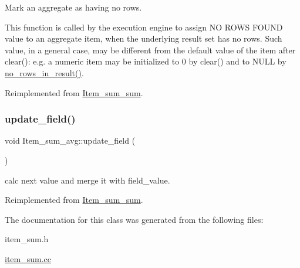 Mark an aggregate as having no rows.

This function is called by the execution engine to assign \textquotesingle{}NO R\+O\+WS F\+O\+U\+ND\textquotesingle{} value to an aggregate item, when the underlying result set has no rows. Such value, in a general case, may be different from the default value of the item after \textquotesingle{}clear()\textquotesingle{}\+: e.\+g. a numeric item may be initialized to 0 by clear() and to N\+U\+LL by \mbox{\hyperlink{classItem__sum__avg_ab4cfa5a3c42abc40f7f3fdb95c92d568}{no\+\_\+rows\+\_\+in\+\_\+result()}}. 

Reimplemented from \mbox{\hyperlink{classItem__sum__sum_aa610e5d4e5371dcea4625416d7d79d93}{Item\+\_\+sum\+\_\+sum}}.

\mbox{\label{classItem__sum__avg_a682bfcb0bec9487bcd2c26d1aa200aa5}} 
\subsubsection{\texorpdfstring{update\+\_\+field()}{update\_field()}}
{\footnotesize\ttfamily void Item\+\_\+sum\+\_\+avg\+::update\+\_\+field (\begin{DoxyParamCaption}{ }\end{DoxyParamCaption})\hspace{0.3cm}{\ttfamily [virtual]}}

calc next value and merge it with field\+\_\+value. 

Reimplemented from \mbox{\hyperlink{classItem__sum__sum_a00f3c26e38463e41da4e41613d37f0bf}{Item\+\_\+sum\+\_\+sum}}.



The documentation for this class was generated from the following files\+:\begin{DoxyCompactItemize}
\item 
item\+\_\+sum.\+h\item 
\mbox{\hyperlink{item__sum_8cc}{item\+\_\+sum.\+cc}}\end{DoxyCompactItemize}
